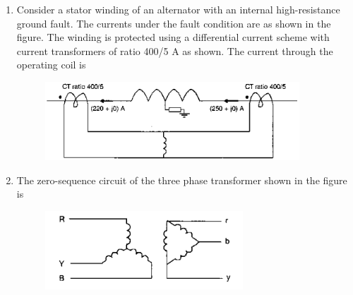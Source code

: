 \documentclass[12pt]{article}
\theoremstyle{remark}
\begin{document}
\begin{enumerate}
\item Consider a stator winding of an alternator with an internal high-resistance ground fault. The currents under the fault condition are as shown in the figure. The winding is protected using a differential current scheme with current transformers of ratio 400/5 A as shown. The current through the operating coil is
\begin{figure}[H]
    \centering
    \includegraphics[width=0.9\textwidth]{Figs/Q19.png}
    \caption{}
    \label{fig:1.10}
\end{figure}
\begin{enumerate}
\end{enumerate}
\hfill{}

\item The zero-sequence circuit of the three phase transformer shown in the figure is
\begin{figure}[H]
    \centering
    \includegraphics[width=0.7\textwidth]{Figs/Q20.png}
    \caption{}
    \label{fig:1.11}
\end{figure}
\hfill{}


\end{enumerate}
\end{document}
